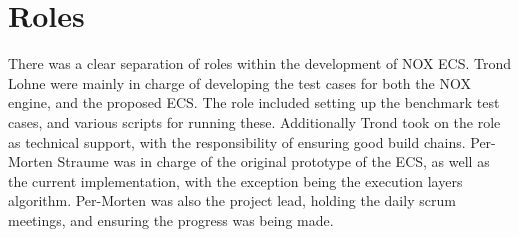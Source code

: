 \section{Roles}
There was a clear separation of roles within the development of NOX ECS.
Trond Lohne were mainly in charge of developing the test cases for both the NOX engine,
and the proposed ECS.
The role included setting up the benchmark test cases, and various scripts for running these.
Additionally Trond took on the role as technical support, with the responsibility of ensuring
good build chains.
Per-Morten Straume was in charge of the original prototype of the ECS, as well as the current implementation,
with the exception being the execution layers algorithm.
Per-Morten was also the project lead, holding the daily scrum meetings, and ensuring the progress was being made.

